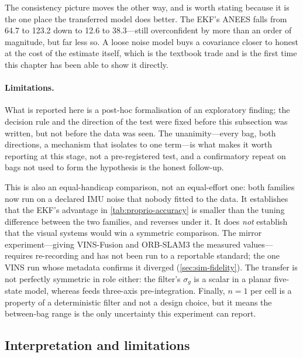 The consistency picture moves the other way, and is worth stating because it is
the one place the transferred model does better. The EKF's ANEES falls from 64.7
to 123.2 down to 12.6 to 38.3---still overconfident by more than an order of
magnitude, but far less so. A loose noise model buys a covariance closer to
honest at the cost of the estimate itself, which is the textbook trade and is the
first time this chapter has been able to show it directly.

\paragraph{Limitations.}
\begin{queried}
 What is reported here is a post-hoc formalisation of an exploratory
finding; the decision rule and the direction of the test were fixed before this
subsection was written, but not before the data was seen. The unanimity---every
bag, both directions, a mechanism that isolates to one term---is what makes it
worth reporting at this stage, not a pre-registered test, and a confirmatory
repeat on bags not used to form the hypothesis is the honest follow-up.

This is also an equal-handicap comparison, not an equal-effort one: both families
now run on a declared IMU noise that nobody fitted to the data. It establishes
that the EKF's advantage in \cref{tab:proprio-accuracy} is smaller than the
tuning difference between the two families, and reverses under it. It does
\emph{not} establish that the visual systems would win a symmetric comparison.
The mirror experiment---giving VINS-Fusion and ORB-SLAM3 the measured
values---requires re-recording and has not been run to a reportable standard; the
one VINS run whose metadata confirms it diverged (\cref{sec:sim-fidelity}). The
transfer is not perfectly symmetric in role either: the filter's $\sigma_{g}$ is
a scalar in a planar five-state model, whereas  feeds three-axis
pre-integration. Finally, $n=1$ per cell is a property of a deterministic filter
and not a design choice, but it means the between-bag range is the only
uncertainty this experiment can report.
\end{queried}

\subsection{Interpretation and limitations}

